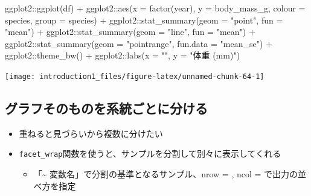 \documentclass[
]{ltjsarticle}
\newenvironment{Shaded}{\begin{snugshade}}{\end{snugshade}}
\newcommand{\AttributeTok}[1]{\textcolor[rgb]{0.77,0.63,0.00}{#1}}
\newcommand{\FunctionTok}[1]{\textcolor[rgb]{0.00,0.00,0.00}{#1}}
\newcommand{\NormalTok}[1]{#1}
\newcommand{\SpecialCharTok}[1]{\textcolor[rgb]{0.00,0.00,0.00}{#1}}
\newcommand{\StringTok}[1]{\textcolor[rgb]{0.31,0.60,0.02}{#1}}
\providecommand{\tightlist}{%
  \setlength{\itemsep}{0pt}\setlength{\parskip}{0pt}}
\begin{document}
\begin{Shaded}
\begin{Highlighting}[]
\NormalTok{ggplot2}\SpecialCharTok{::}\FunctionTok{ggplot}\NormalTok{(df) }\SpecialCharTok{+}
\NormalTok{  ggplot2}\SpecialCharTok{::}\FunctionTok{aes}\NormalTok{(}\AttributeTok{x =} \FunctionTok{factor}\NormalTok{(year), }\AttributeTok{y =}\NormalTok{ body\_mass\_g, }\AttributeTok{colour =}\NormalTok{ species, }\AttributeTok{group =}\NormalTok{ species) }\SpecialCharTok{+}
\NormalTok{  ggplot2}\SpecialCharTok{::}\FunctionTok{stat\_summary}\NormalTok{(}\AttributeTok{geom =} \StringTok{"point"}\NormalTok{, }\AttributeTok{fun =} \StringTok{"mean"}\NormalTok{) }\SpecialCharTok{+}
\NormalTok{  ggplot2}\SpecialCharTok{::}\FunctionTok{stat\_summary}\NormalTok{(}\AttributeTok{geom =} \StringTok{"line"}\NormalTok{, }\AttributeTok{fun =} \StringTok{"mean"}\NormalTok{) }\SpecialCharTok{+}
\NormalTok{  ggplot2}\SpecialCharTok{::}\FunctionTok{stat\_summary}\NormalTok{(}\AttributeTok{geom =} \StringTok{"pointrange"}\NormalTok{, }\AttributeTok{fun.data =} \StringTok{"mean\_se"}\NormalTok{) }\SpecialCharTok{+}
\NormalTok{  ggplot2}\SpecialCharTok{::}\FunctionTok{theme\_bw}\NormalTok{() }\SpecialCharTok{+}
\NormalTok{  ggplot2}\SpecialCharTok{::}\FunctionTok{labs}\NormalTok{(}\AttributeTok{x =} \StringTok{""}\NormalTok{, }\AttributeTok{y =} \StringTok{"体重 (mm)"}\NormalTok{)}
\end{Highlighting}
\end{Shaded}

\begin{center}\texttt{[image: introduction1\_files/figure-latex/unnamed-chunk-64-1]} \end{center}

\hypertarget{ux30b0ux30e9ux30d5ux305dux306eux3082ux306eux3092ux7cfbux7d71ux3054ux3068ux306bux5206ux3051ux308b}{%
\subsection{グラフそのものを系統ごとに分ける}\label{ux30b0ux30e9ux30d5ux305dux306eux3082ux306eux3092ux7cfbux7d71ux3054ux3068ux306bux5206ux3051ux308b}}

\begin{itemize}
\tightlist
\item
  重ねると見づらいから複数に分けたい
\item
  \texttt{facet\_wrap}関数を使うと、サンプルを分割して別々に表示してくれる

  \begin{itemize}
  \tightlist
  \item
    「\textasciitilde{} 変数名」で分割の基準となるサンプル、nrow = ,
    ncol = で出力の並べ方を指定
  \end{itemize}
\end{itemize}
\end{document}

